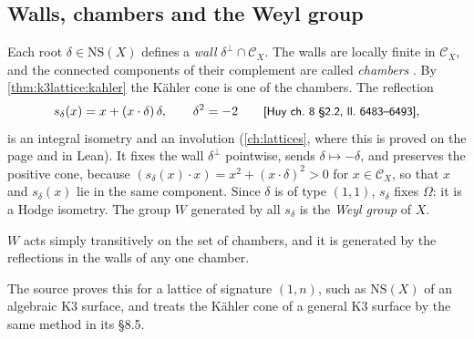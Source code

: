 \subsection{Walls, chambers and the Weyl group}
Each root $\delta\in\mathrm{NS}(X)$ defines a \emph{wall} $\delta^\perp\cap
\mathcal C_X$. The walls are locally finite in $\mathcal C_X$, and the connected components
of their complement are called \emph{chambers}
. By \cref{thm:k3lattice:kahler} the Kähler cone is
one of the chambers. The reflection
\begin{equation}\label{eq:k3lattice:refl}
 s_\delta(x)=x+(x\cdot\delta)\,\delta,\qquad\delta^2=-2
 \qquad\text{{\small\textsf{[Huy ch.~8 §2.2, ll.~6483--6493]}}} ,
\end{equation}
is an integral isometry and an involution (\cref{ch:lattices}, where this is proved on the
page and in Lean). It fixes the wall $\delta^\perp$ pointwise, sends $\delta\mapsto-\delta$,
and preserves the positive cone, because $(s_\delta(x)\cdot x)=x^2+(x\cdot\delta)^2>0$ for
$x\in\mathcal C_X$, so that $x$ and $s_\delta(x)$ lie in the same component. Since $\delta$
is of type $(1,1)$, $s_\delta$ fixes $\Omega$: it is a Hodge isometry. The group $W$
generated by all $s_\delta$ is the \emph{Weyl group} of $X$.

\begin{proposition}[Tier~L]\label{prop:k3lattice:weyl}
$W$ acts simply transitively on the set of chambers, and it is generated by the reflections
in the walls of any one chamber. \TL{}
\end{proposition}
The source proves this for a lattice of signature $(1,n)$, such as $\mathrm{NS}(X)$ of an
algebraic K3 surface, and treats the Kähler cone of a general K3 surface by the same method
in its §8.5.

